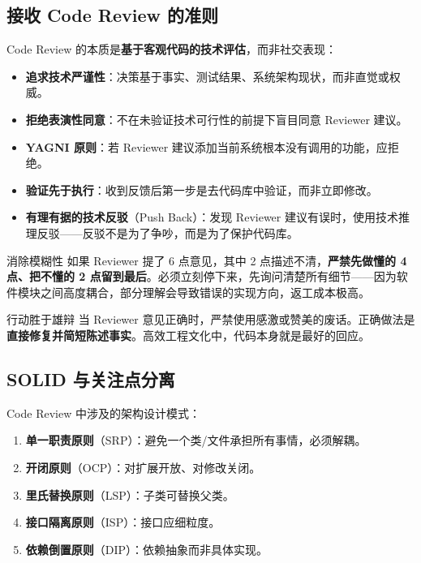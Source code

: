 \documentclass[a4paper]{article}
\begin{document}
\subsection{接收 Code Review 的准则}

Code Review 的本质是\textbf{基于客观代码的技术评估}，而非社交表现：

\begin{itemize}
    \item \textbf{追求技术严谨性}：决策基于事实、测试结果、系统架构现状，而非直觉或权威。
    \item \textbf{拒绝表演性同意}：不在未验证技术可行性的前提下盲目同意 Reviewer 建议。
    \item \textbf{YAGNI 原则}：若 Reviewer 建议添加当前系统根本没有调用的功能，应拒绝。
    \item \textbf{验证先于执行}：收到反馈后第一步是去代码库中验证，而非立即修改。
    \item \textbf{有理有据的技术反驳}（Push Back）：发现 Reviewer 建议有误时，使用技术推理反驳——反驳不是为了争吵，而是为了保护代码库。
\end{itemize}

\begin{knowledgebox}{消除模糊性}
如果 Reviewer 提了 6 点意见，其中 2 点描述不清，\textbf{严禁先做懂的 4 点、把不懂的 2 点留到最后}。必须立刻停下来，先询问清楚所有细节——因为软件模块之间高度耦合，部分理解会导致错误的实现方向，返工成本极高。
\end{knowledgebox}

\begin{importantbox}{行动胜于雄辩}
当 Reviewer 意见正确时，严禁使用感激或赞美的废话。正确做法是\textbf{直接修复并简短陈述事实}。高效工程文化中，代码本身就是最好的回应。
\end{importantbox}

\subsection{SOLID 与关注点分离}

Code Review 中涉及的架构设计模式：

\begin{enumerate}
    \item \textbf{单一职责原则}（SRP）：避免一个类/文件承担所有事情，必须解耦。
    \item \textbf{开闭原则}（OCP）：对扩展开放、对修改关闭。
    \item \textbf{里氏替换原则}（LSP）：子类可替换父类。
    \item \textbf{接口隔离原则}（ISP）：接口应细粒度。
    \item \textbf{依赖倒置原则}（DIP）：依赖抽象而非具体实现。
\end{enumerate}
\end{document}
